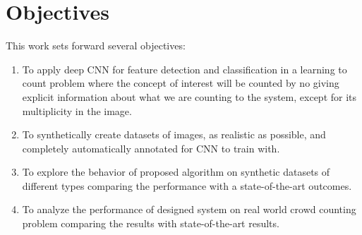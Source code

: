 \section{Objectives}
This work sets forward several objectives:
\begin{enumerate}
	\item To apply deep CNN for feature detection and classification in a learning to count problem where the concept of interest will be counted by no giving explicit information about what we are counting to the system, except for its multiplicity in the image. 
	\item To synthetically create datasets of images, as realistic as possible, and completely automatically annotated for CNN to train with.
	\item To explore the behavior of proposed algorithm on synthetic datasets of different types comparing the performance with a state-of-the-art outcomes\cite{segui2015learning}.   
	\item To analyze the performance of designed system on real world crowd counting problem comparing the results with state-of-the-art results\cite{chan2008privacy}.   

\end{enumerate}
